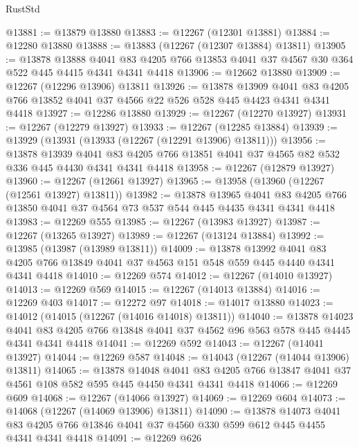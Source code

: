 \begin{lexlean}{RustStd}
\begin{coremodule}
@13881 := @13879 @13880
@13883 := @12267 (@12301 @13881)
@13884 := @12280 @13880
@13888 := @13883 (@12267 (@12307 @13884) @13811)
@13905 := @13878
    @13888
    @4041
    @83
    @4205
    @766
    @13853
    @4041
    @37
    @4567
    @30
    @364
    @522
    @445
    @4415
    @4341
    @4341
    @4418
@13906 := @12662 @13880
@13909 := @12267 (@12296 @13906) @13811
@13926 := @13878
    @13909
    @4041
    @83
    @4205
    @766
    @13852
    @4041
    @37
    @4566
    @22
    @526
    @528
    @445
    @4423
    @4341
    @4341
    @4418
@13927 := @12286 @13880
@13929 := @12267 (@12270 @13927)
@13931 := @12267 (@12279 @13927)
@13933 := @12267 (@12285 @13884)
@13939 := @13929 (@13931 (@13933 (@12267 (@12291 @13906) @13811)))
@13956 := @13878
    @13939
    @4041
    @83
    @4205
    @766
    @13851
    @4041
    @37
    @4565
    @82
    @532
    @336
    @445
    @4430
    @4341
    @4341
    @4418
@13958 := @12267 (@12879 @13927)
@13960 := @12267 (@12661 @13927)
@13965 := @13958 (@13960 (@12267 (@12561 @13927) @13811))
@13982 := @13878
    @13965
    @4041
    @83
    @4205
    @766
    @13850
    @4041
    @37
    @4564
    @73
    @537
    @544
    @445
    @4435
    @4341
    @4341
    @4418
@13983 := @12269 @555
@13985 := @12267 (@13983 @13927)
@13987 := @12267 (@13265 @13927)
@13989 := @12267 (@13124 @13884)
@13992 := @13985 (@13987 (@13989 @13811))
@14009 := @13878
    @13992
    @4041
    @83
    @4205
    @766
    @13849
    @4041
    @37
    @4563
    @151
    @548
    @559
    @445
    @4440
    @4341
    @4341
    @4418
@14010 := @12269 @574
@14012 := @12267 (@14010 @13927)
@14013 := @12269 @569
@14015 := @12267 (@14013 @13884)
@14016 := @12269 @403
@14017 := @12272 @97
@14018 := @14017 @13880
@14023 := @14012 (@14015 (@12267 (@14016 @14018) @13811))
@14040 := @13878
    @14023
    @4041
    @83
    @4205
    @766
    @13848
    @4041
    @37
    @4562
    @96
    @563
    @578
    @445
    @4445
    @4341
    @4341
    @4418
@14041 := @12269 @592
@14043 := @12267 (@14041 @13927)
@14044 := @12269 @587
@14048 := @14043 (@12267 (@14044 @13906) @13811)
@14065 := @13878
    @14048
    @4041
    @83
    @4205
    @766
    @13847
    @4041
    @37
    @4561
    @108
    @582
    @595
    @445
    @4450
    @4341
    @4341
    @4418
@14066 := @12269 @609
@14068 := @12267 (@14066 @13927)
@14069 := @12269 @604
@14073 := @14068 (@12267 (@14069 @13906) @13811)
@14090 := @13878
    @14073
    @4041
    @83
    @4205
    @766
    @13846
    @4041
    @37
    @4560
    @330
    @599
    @612
    @445
    @4455
    @4341
    @4341
    @4418
@14091 := @12269 @626

\end{coremodule}
\end{lexlean}
